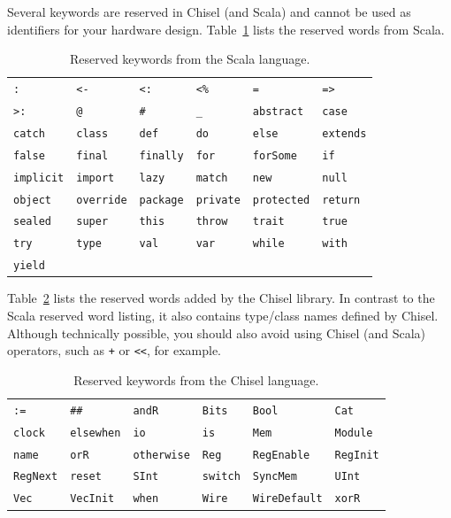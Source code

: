 \documentclass[%
    10pt,
    headinclude, footexclude,
    openright, %
    notitlepage,
    cleardoubleempty,
    headsepline,
    pointlessnumbers,
    bibtotoc, idxtotoc,
    ]{scrbook}
\newcommand{\code}[1]{{\small{\texttt{#1}}}}
\begin{document}
Several keywords are reserved in Chisel (and Scala) and cannot be used as identifiers
for your hardware design.
Table~\ref{tab:reserved:scala} lists the reserved words from Scala.

\begin{table}[h]
\centering
\begin{tabular}{llllll}
\code{:}  & \code{<-}  & \code{<:}  & \code{<\%}  & \code{=}  & \code{=>} \\
\code{>:}  & \code{@}  & \code{\#}  & \code{\_}  & \code{abstract}  & \code{case} \\
\code{catch}  & \code{class}  & \code{def}  & \code{do}  & \code{else}  & \code{extends} \\
\code{false}  & \code{final}  & \code{finally}  & \code{for}  & \code{forSome}  & \code{if} \\
\code{implicit}  & \code{import}  & \code{lazy}  & \code{match}  & \code{new}  & \code{null} \\
\code{object}  & \code{override}  & \code{package}  & \code{private}  & \code{protected}  & \code{return} \\
\code{sealed}  & \code{super}  & \code{this}  & \code{throw}  & \code{trait}  & \code{true} \\
\code{try}  & \code{type}  & \code{val}  & \code{var}  & \code{while}  & \code{with} \\
\code{yield}  & \\
\end{tabular}
\caption{Reserved keywords from the Scala language.}
\label{tab:reserved:scala}
\end{table}

Table~\ref{tab:reserved:chisel} lists the reserved words added by the Chisel library.
In contrast to the Scala reserved word listing, it also contains type/class names defined by Chisel.
Although technically possible, you should also avoid using Chisel (and Scala) operators, such as
\code{+} or \code{<<}, for example. %

\begin{table}[h]
\centering
\begin{tabular}{llllll}
\code{:=}  & \code{\#\#}  & \code{andR}  & \code{Bits}  & \code{Bool}  & \code{Cat} \\
\code{clock}  & \code{elsewhen}  & \code{io}  & \code{is}  & \code{Mem}  & \code{Module} \\
\code{name}  & \code{orR}  & \code{otherwise}  & \code{Reg}  & \code{RegEnable}  & \code{RegInit} \\
\code{RegNext}  & \code{reset}  & \code{SInt}  & \code{switch}  & \code{SyncMem}  & \code{UInt} \\
\code{Vec}  & \code{VecInit}  & \code{when}  & \code{Wire}  & \code{WireDefault}  & \code{xorR} \\
\end{tabular}
\caption{Reserved keywords from the Chisel language.}
\label{tab:reserved:chisel}
\end{table}
\end{document}
